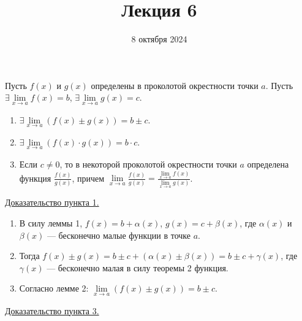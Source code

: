 \documentclass{article}
\title{Лекция 6}
\author{}
\date{8 октября 2024}
\begin{document}
\maketitle

\begin{theorem}
    Пусть \(f(x)\) и \(g(x)\) определены в проколотой окрестности точки \(a\). Пусть \(\exists \lim\limits_{x \to a}f(x) = b\), \(\exists \lim\limits_{x \to a}g(x) = c\).
    \begin{enumerate}
        \item \(\exists \lim\limits_{x \to a}(f(x) \pm g(x)) = b \pm c\).
        \item \(\exists \lim\limits_{x \to a}(f(x) \cdot g(x)) = b \cdot c\).
        \item Если \(c \neq 0\), то в некоторой проколотой окрестности точки \(a\) определена функция \(\displaystyle \frac{f(x)}{g(x)}\), причем \(\displaystyle \lim\limits_{x \to a} \frac{f(x)}{g(x)} = \frac{\lim\limits_{x \to a}f(x)}{\lim\limits_{x \to a}g(x)}\).      
    \end{enumerate}     
\end{theorem}
\noindent
\underline{Доказательство пункта 1.}
\begin{enumerate}
    \item В силу леммы 1, \(f(x) = b + \alpha(x)\), \(g(x) = c + \beta(x)\), где \(\alpha(x)\) и \(\beta (x)\) --- бесконечно малые функции в точке \(a\).
    \item Тогда \(f(x) \pm g(x) = b \pm c + (\alpha(x) \pm \beta(x)) = b \pm c + \gamma(x)\), где \(\gamma(x)\) --- бесконечно малая в силу теоремы 2 функция.
    \item Согласно лемме 2: \(\lim\limits_{x \to a}(f(x) \pm g(x)) = b \pm c\).
\end{enumerate}
\noindent 
\underline{Доказательство пункта 3.}
\end{document}
